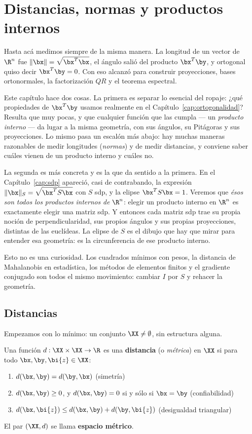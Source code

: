 \chapter{Distancias, normas y productos internos}\label{cap:normas}

Hasta acá medimos siempre de la misma manera. La longitud de un vector de
$\R^n$ fue $\|\bx\|=\sqrt{\bx^T\bx}$, el ángulo salió del producto
$\bx^T\by$, y ortogonal quiso decir $\bx^T\by=0$. Con eso alcanzó para
construir proyecciones, bases ortonormales, la factorización $QR$ y el
teorema espectral.

Este capítulo hace dos cosas. La primera es separar lo esencial del ropaje:
¿qué propiedades de $\bx^T\by$ usamos realmente en el
Capítulo~\ref{cap:ortogonalidad}? Resulta que muy pocas, y que cualquier
función que las cumpla --- un \emph{producto interno} --- da lugar a la misma
geometría, con sus ángulos, su Pitágoras y sus proyecciones. Lo mismo pasa un
escalón más abajo: hay muchas maneras razonables de medir longitudes
(\emph{normas}) y de medir distancias, y conviene saber cuáles vienen de un
producto interno y cuáles no.

La segunda es más concreta y es la que da sentido a la primera. En el
Capítulo~\ref{cap:sdp} apareció, casi de contrabando, la expresión
$\|\bx\|_S=\sqrt{\bx^TS\bx}$ con $S$ sdp, y la elipse $\bx^TS\bx=1$.
Veremos que \emph{ésos son todos los productos internos de $\R^n$}: elegir un
producto interno en $\R^n$ es exactamente elegir una matriz sdp. Y entonces
cada matriz sdp trae su propia noción de perpendicularidad, sus propios
ángulos y sus propias proyecciones, distintas de las euclídeas. La elipse de
$S$ es el dibujo que hay que mirar para entender esa geometría: es la
circunferencia de ese producto interno.

Esto no es una curiosidad. Los cuadrados mínimos con pesos, la distancia de
Mahalanobis en estadística, los métodos de elementos finitos y el gradiente
conjugado son todos el mismo movimiento: cambiar $I$ por $S$ y rehacer la
geometría.

\section{Distancias}
\label{sec:distancias}

Empezamos con lo mínimo: un conjunto $\XX\neq\emptyset$, sin estructura
alguna.

\begin{definition}
Una función $d:\XX\times\XX\to\R$ es una \textbf{distancia} (o
\emph{métrica}) en $\XX$ si para todo $\bx,\by,\bi{z}\in\XX$:
\begin{enumerate}[label=\textup{(d\arabic*)}]
\item $d(\bx,\by)=d(\by,\bx)$ \hfill (simetría)
\item $d(\bx,\by)\ge 0$, y $d(\bx,\by)=0$ si y sólo si $\bx=\by$
\hfill (confiabilidad)
\item $d(\bx,\bi{z})\le d(\bx,\by)+d(\by,\bi{z})$ \hfill (desigualdad triangular)
\end{enumerate}
El par $(\XX,d)$ se llama \textbf{espacio métrico}.
\end{definition}


